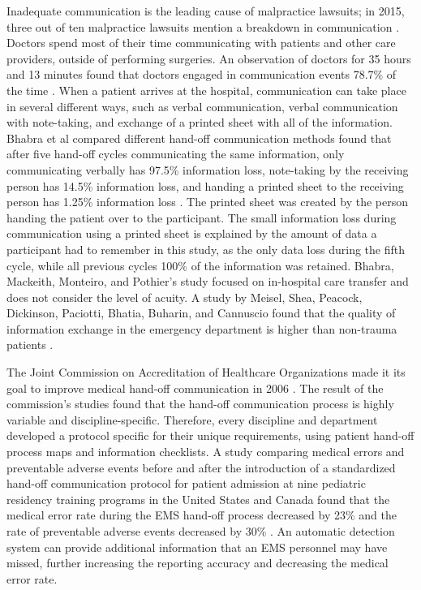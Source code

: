 \par Inadequate communication is the leading cause of malpractice lawsuits; in 2015, three out of ten malpractice lawsuits mention a breakdown in communication \cite{CRICOStrategies.2015}. Doctors spend most of their time communicating with patients and other care providers, outside of performing surgeries. An observation of doctors for 35 hours and 13 minutes found that doctors engaged in communication events 78.7\% of the time \cite{Spencer2004}. When a patient arrives at the hospital, communication can take place in several different ways, such as verbal communication, verbal communication with note-taking, and exchange of a printed sheet with all of the information. Bhabra et al compared different hand-off communication methods found that after five hand-off cycles communicating the same information, only communicating verbally has 97.5\% information loss, note-taking by the receiving person has 14.5\% information loss, and handing a printed sheet to the receiving person has 1.25\% information loss \cite{Bhabra2007}. The printed sheet was created by the person handing the patient over to the participant. The small information loss during communication using a printed sheet is explained by the amount of data a participant had to remember in this study, as the only data loss during the fifth cycle, while all previous cycles 100\% of the information was retained. Bhabra, Mackeith, Monteiro, and Pothier’s study focused on in-hospital care transfer and does not consider the level of acuity. A study by Meisel, Shea, Peacock, Dickinson, Paciotti, Bhatia, Buharin, and Cannuscio found that the quality of information exchange in the emergency department is higher than non-trauma patients \cite{Meisel2015}.
\par The Joint Commission on Accreditation of Healthcare Organizations made it its goal to improve medical hand-off communication in 2006 \cite{Arora2006}. The result of the commission’s studies found that the hand-off communication process is highly variable and discipline-specific. Therefore, every discipline and department developed a protocol specific for their unique requirements, using patient hand-off process maps and information checklists. A study comparing medical errors and preventable adverse events before and after the introduction of a standardized hand-off communication protocol for patient admission at nine pediatric residency training programs in the United States and Canada found that the medical error rate during the EMS hand-off process decreased by 23\% and the rate of preventable adverse events decreased by 30\% \cite{Starmer2014}. An automatic detection system can provide additional information that an \gls{EMS} personnel may have missed, further increasing the reporting accuracy and decreasing the medical error rate.
